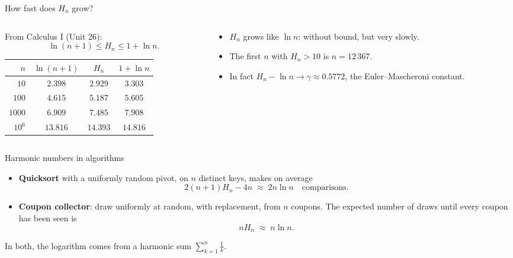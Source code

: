 \documentclass{wosm-slides}
\begin{document}
\begin{frame}{How fast does $H_n$ grow?}
  \begin{columns}[T]
    \begin{column}{0.5\textwidth}
      From Calculus I (Unit 26):
      \[ \ln(n+1) \le H_n \le 1 + \ln n . \]
      \begin{center}
      \small
      \begin{tabular}{rccc}
        \toprule
        $n$ & $\ln(n+1)$ & $H_n$ & $1 + \ln n$ \\
        \midrule
        $10$     & $2.398$  & $2.929$  & $3.303$ \\
        $100$    & $4.615$  & $5.187$  & $5.605$ \\
        $1000$   & $6.909$  & $7.485$  & $7.908$ \\
        $10^6$   & $13.816$ & $14.393$ & $14.816$ \\
        \bottomrule
      \end{tabular}
      \end{center}
    \end{column}
    \begin{column}{0.46\textwidth}
      \begin{itemize}
        \item $H_n$ grows like $\ln n$: without bound, but very slowly.
        \item The first $n$ with $H_n > 10$ is $n = 12\,367$.
        \item In fact $H_n - \ln n \to \gamma \approx 0.5772$,
          the Euler--Mascheroni constant.
      \end{itemize}
    \end{column}
  \end{columns}
\end{frame}

\begin{frame}{Harmonic numbers in algorithms}
  \begin{itemize}
    \item \textbf{Quicksort} with a uniformly random pivot, on $n$ distinct keys, makes
      on average
      \[ 2(n+1) H_n - 4n \;\approx\; 2 n \ln n \quad\text{comparisons.} \]
    \item \textbf{Coupon collector}: draw uniformly at random, with replacement,
      from $n$ coupons. The expected number of draws until every coupon has been seen is
      \[ n H_n \;\approx\; n \ln n . \]
  \end{itemize}
  In both, the logarithm comes from a harmonic sum $\sum_{k=1}^{n} \frac1k$.
\end{frame}
\end{document}

